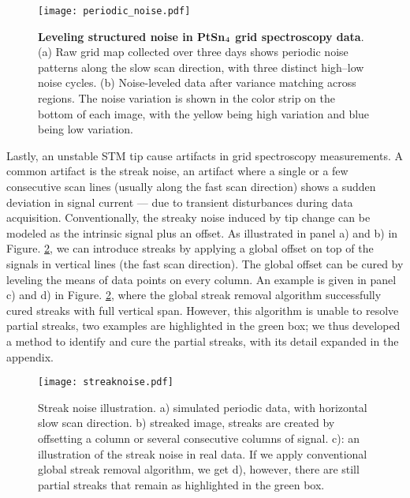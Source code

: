  

\begin{figure}
	\texttt{[image: periodic\_noise.pdf]} 
	\centering
	\caption[\textbf{Leveling structured noise in PtSn$\textsubscript{4}$ grid spectroscopy data}]{\textbf{Leveling structured noise in PtSn$\textsubscript{4}$ grid spectroscopy data}. (a) Raw grid map collected over three days shows periodic noise patterns along the slow scan direction, with three distinct high–low noise cycles. (b) Noise-leveled data after variance matching across regions. The noise variation is shown in the color strip on the bottom of each image, with the yellow being high variation and blue being low variation.}
	\label{fig:periodic_noise}
\end{figure}

Lastly, an unstable \ac{STM} tip cause artifacts in grid spectroscopy measurements. A common  artifact is the streak noise, an artifact where a single or a few consecutive scan lines (usually along the fast scan direction) shows a sudden deviation in signal current — due to transient disturbances during data acquisition. Conventionally, the streaky noise induced by tip change can be modeled as the intrinsic signal plus an offset. As illustrated in panel a) and b) in Figure. \ref{fig:streaks}, we can introduce streaks by applying a global offset on top of the signals in vertical lines (the fast scan direction). The global offset can be cured by leveling the means of data points on every column. An example is given in panel c) and d) in Figure. \ref{fig:streaks}, where the global streak removal algorithm successfully cured streaks with full vertical span. However, this algorithm is unable to resolve partial streaks, two examples are highlighted in the green box; we thus developed a method to identify and cure the partial streaks, with its detail expanded in the appendix.

\begin{figure}
	\texttt{[image: streaknoise.pdf]} 
	\centering
	\caption{Streak noise illustration. a) simulated periodic data, with horizontal slow scan direction. b) streaked image, streaks are created by offsetting a column or several consecutive columns of signal. c): an illustration of the streak noise in real data. If we apply conventional global streak removal algorithm, we get d), however, there are still partial streaks that remain as highlighted in the green box.}
	\label{fig:streaks}
\end{figure}

